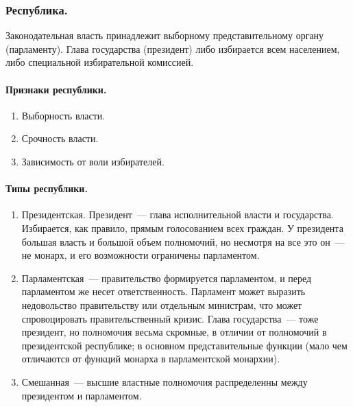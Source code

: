 \documentclass{article}
\begin{document}
	\subsubsection{Республика.}
	\begin{definition}[Республика]
		Законодательная власть принадлежит выборному представительному органу (парламенту). Глава государства (президент) либо избирается всем населением, либо специальной избирательной комиссией.
	\end{definition}
	\paragraph{Признаки республики.}
	\begin{enumerate}
		\item Выборность власти.
		\item Срочность власти.
		\item Зависимость от воли избирателей.
	\end{enumerate}
	\paragraph{Типы республики.}
	\begin{enumerate}
		\item Президентская. Президент~--- глава исполнительной власти и государства. Избирается, как правило, прямым голосованием всех граждан. У президента большая власть и большой объем полномочий, но несмотря на все это он~--- не монарх, и его возможности ограничены парламентом.
		\item Парламентская~--- правительство формируется парламентом, и перед парламентом же несет ответственность. Парламент может выразить недовольство правительству или отдельным министрам, что может спровоцировать правительственный кризис. Глава государства~--- тоже президент, но полномочия весьма скромные, в отличии от полномочий в президентской республике; в основном представительные функции (мало чем отличаются от функций монарха в парламентской монархии).
		\item Смешанная~--- высшие властные полномочия распределенны между президентом и парламентом.
	\end{enumerate}
\end{document}
